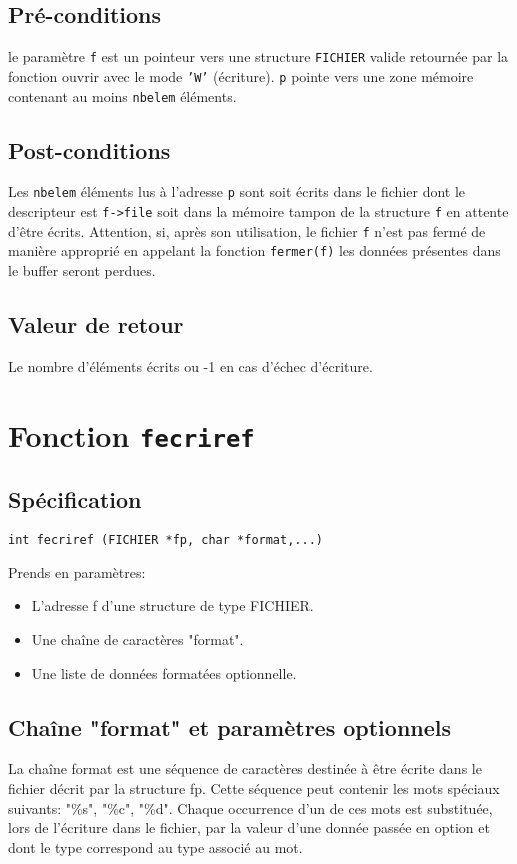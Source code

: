 \documentclass[11pt]{article}
\theoremstyle{definition}
\theoremstyle{definition}
\begin{document}
\subsection{Pré-conditions}
le paramètre \texttt{f} est un pointeur vers une structure \texttt{FICHIER} valide retournée par
la fonction ouvrir avec le mode \texttt{'W'} (écriture). \texttt{p} pointe vers une zone mémoire
contenant au moins \texttt{nbelem} éléments.

\subsection{Post-conditions}
Les \texttt{nbelem} éléments lus à l'adresse \texttt{p} sont soit écrits dans le fichier dont le descripteur
est \texttt{f->file} soit dans la mémoire tampon de la structure \texttt{f} en attente d'être écrits.
Attention, si, après son utilisation, le fichier \texttt{f} n'est pas fermé de manière approprié en appelant la fonction \texttt{fermer(f)}
les données présentes dans le buffer seront perdues.

\subsection{Valeur de retour}
Le nombre d'éléments écrits ou -1 en cas d'échec d'écriture.






\section{Fonction \texttt{fecriref}}
\subsection{Spécification}
\texttt{int fecriref (FICHIER *fp, char *format,...)}

Prends en paramètres:
\begin{itemize}
\item L'adresse f d'une structure de type FICHIER.
\item Une chaîne de caractères "format".
\item Une liste de données formatées optionnelle.
\end{itemize}

\subsection{Chaîne "format" et paramètres optionnels}
La chaîne format est une séquence de caractères destinée à être écrite dans le
fichier décrit par la structure fp. Cette séquence peut contenir les mots spéciaux
suivants: "\%s", "\%c", "\%d". Chaque occurrence d'un de ces mots est substituée,
lors de l'écriture dans le fichier, par la valeur d'une donnée passée en option et
dont le type correspond au type associé au mot.
\end{document}
